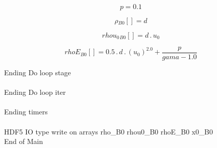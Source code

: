 \documentclass{article}
\begin{document}
\begin{dmath}p = 0.1\end{dmath}

\begin{dmath}{\rho{_{B0}}}[{}] = d\end{dmath}

\begin{dmath}{rhou_{0}{_{B0}}}[{}] = d \,.\, u_{0}\end{dmath}

\begin{dmath}{rhoE{_{B0}}}[{}] = 0.5 \,.\, d \,.\, \left(u_{0} \right)^{2.0} + \frac{p}{gama - 1.0}\end{dmath}

\noindent Ending Do loop stage\\
\\\noindent Ending Do loop iter\\
\\\noindent Ending timers\\
\\\noindent HDF5 IO type write on arrays rho_B0 rhou0_B0 rhoE_B0 x0_B0\\\noindent End of Main\\
\end{document}
